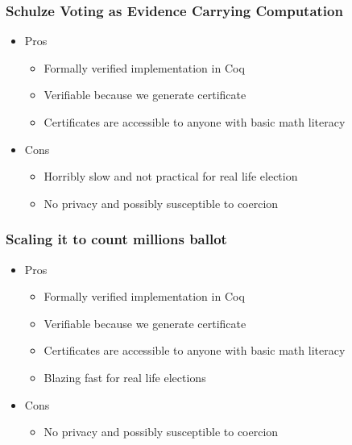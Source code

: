 \documentclass{beamer}
\begin{document}
\begin{frame}
\frametitle{Schulze Voting as Evidence Carrying Computation}
\begin{itemize}[]
\item Pros 
\begin{itemize}
\item Formally verified implementation in Coq
\item Verifiable because we generate certificate
\item Certificates are accessible to anyone with 
      basic math literacy
\end{itemize}
\item Cons
\begin{itemize}
\item Horribly slow and not practical for real life election
\item No privacy and possibly susceptible to coercion
\end{itemize}
\end{itemize}
\end{frame}


\begin{frame}
\frametitle{Scaling it to count millions ballot }
\begin{itemize}[]
\item Pros 
\begin{itemize}
\item Formally verified implementation in Coq
\item Verifiable because we generate certificate
\item Certificates are accessible to anyone with 
      basic math literacy
\item Blazing fast for real life elections
\end{itemize}
\item Cons
\begin{itemize}
\item No privacy and possibly susceptible to coercion
\end{itemize}
\end{itemize}
\end{frame}
\end{document}
